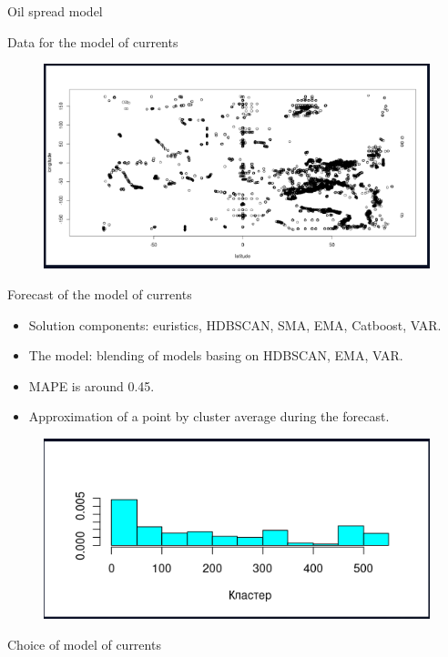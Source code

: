 \documentclass{beamer}
\begin{document}
\begin{section}{Oil spread model}
\begin{frame}{Data for the model of currents}
\begin{figure}[H]
	\centering
	\includegraphics[scale=0.3]{scatter_plots_on_currents.png}
\end{figure}
\end{frame}

\begin{frame}{Forecast of the model of currents}
\begin{itemize}
	\item Solution components: euristics, HDBSCAN, SMA, EMA, Catboost, VAR.
	\item The model: blending of models basing on HDBSCAN, EMA, VAR.
	\item MAPE is around 0.45.
	\item Approximation of a point by cluster average during the forecast.
\end{itemize}

\begin{figure}[H]
	\centering
	\includegraphics[scale=0.3]{histogram_on_currents.png}
\end{figure}

\end{frame}

\begin{frame}{Choice of model of currents}


\end{frame}
\end{section}
\end{document}
